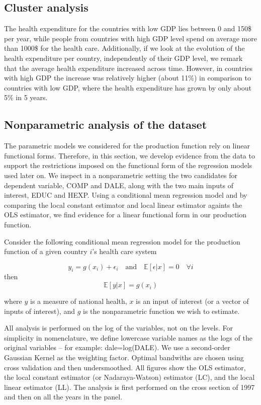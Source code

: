\documentclass[12pt,a4paper]{article}\usepackage[]{graphicx}\usepackage[]{color}
\begin{document}
\subsection{Cluster analysis}



The health expenditure for the countries with low GDP lies between 0 and 150\$ per year, while people from countries with  high GDP level spend on average more than 1000\$ for the health care.  Additionally, if we look at the evolution of the health expenditure per country, independently of their GDP level, we remark that the average health expenditure increased across time. However, in countries with high GDP the increase was relatively higher (about 11\%) in comparison to countries with low GDP,  where the health expenditure has grown by only about 5\% in 5 years.

\subsection{Nonparametric analysis of the dataset}
The parametric models we considered for the production function rely on linear functional forms. Therefore, in this section, we develop evidence from the data to support the restrictions imposed on the functional form of the regression models used later on. We inspect in a nonparametric setting the two candidates for dependent variable, COMP and DALE, along with the two main inputs of interest, EDUC and HEXP. Using a conditional mean regression model and by comparing the local constant estimator and local linear estimator againts the OLS estimator, we find evidence for a linear functional form in our production function. 
 
Consider the following conditional mean regression model for the production function of a given country $i$'s health care system

$$
y_i = g(x_i) + \epsilon_i \quad \textrm{and} \quad \mathbb{E}[\epsilon|x]=0 \quad \forall i
$$
then
$$
\mathbb{E}[y|x]=g(x_i)
$$

where $y$ is a measure of national health, $x$ is an input of interest (or a vector of inputs of interest), and $g$ is the nonparametric function we wish to estimate.
 
All analysis is performed on the log of the variables, not on the levels. For simplicity in nomenclature, we define lowercase variable names as the logs of the original variables -- for example: dale=log(DALE). We use a second-order Gaussian Kernel as the weighting factor. Optimal bandwiths are chosen using cross validation and then undersmoothed. All figures show the OLS estimator, the local constant estimator (or Nadaraya-Watson) estimator (LC), and the local linear estimator (LL). The analysis is first performed on the cross section of 1997 and then on all the years in the panel.
\end{document}
